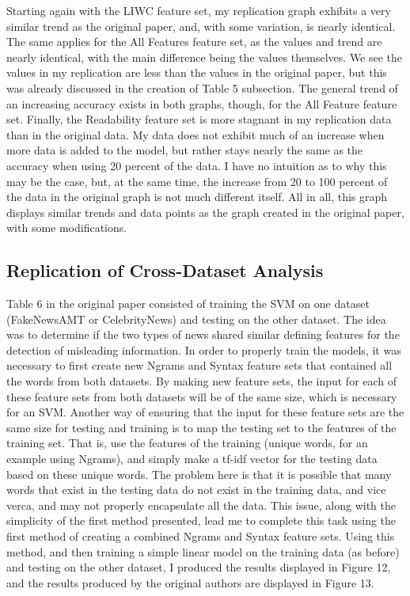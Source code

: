 \documentclass{article}
\begin{document}
Starting again with the LIWC feature set, my replication graph exhibits a very similar trend as the original paper, and, with some variation, is nearly identical. The same applies for the All Features feature set, as the values and trend are nearly identical, with the main difference being the values themselves. We see the values in my replication are less than the values in the original paper, but this was already discussed in the creation of Table 5 subsection. The general trend of an increasing accuracy exists in both graphs, though, for the All Feature feature set. Finally, the Readability feature set is more stagnant in my replication data than in the original data. My data does not exhibit much of an increase when more data is added to the model, but rather stays nearly the same as the accuracy when using 20 percent of the data. I have no intuition as to why this may be the case, but, at the same time, the increase from 20 to 100 percent of the data in the original graph is not much different itself. All in all, this graph displays similar trends and data points as the graph created in the original paper, with some modifications. 

\subsection{Replication of Cross-Dataset Analysis}

Table 6 in the original paper consisted of training the SVM on one dataset (FakeNewsAMT or CelebrityNews) and testing on the other dataset. The idea was to determine if the two types of news shared similar defining features for the detection of misleading information. In order to properly train the models, it was necessary to first create new Ngrams and Syntax feature sets that contained all the words from both datasets. By making new feature sets, the input for each of these feature sets from both datasets will be of the same size, which is necessary for an SVM. Another way of ensuring that the input for these feature sets are the same size for testing and training is to map the testing set to the features of the training set. That is, use the features of the training (unique words, for an example using Ngrams), and simply make a tf-idf vector for the testing data based on these unique words. The problem here is that it is possible that many words that exist in the testing data do not exist in the training data, and vice verca, and may not properly encapsulate all the data. This issue, along with the simplicity of the first method presented, lead me to complete this task using the first method of creating a combined Ngrams and Syntax feature sets. Using this method, and then training a simple linear model on the training data (as before) and testing on the other dataset, I produced the results displayed in Figure 12, and the results produced by the original authors are displayed in Figure 13.
\end{document}
